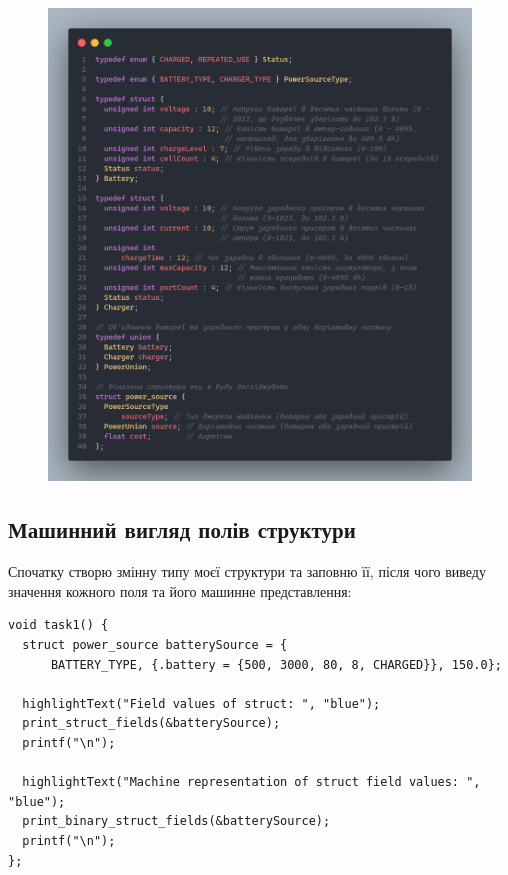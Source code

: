 \begin{figure}[h!]
    \centering
    \includegraphics[width=18cm]{reports/algos/lab4/assets/2.png}
\end{figure}

\clearpage
\subsection{Машинний вигляд полів структури}

Спочатку створю змінну типу моєї структури та заповню її, після чого виведу значення кожного поля та його машинне представлення:

\begin{lstlisting}[style=customc]
void task1() {
  struct power_source batterySource = {
      BATTERY_TYPE, {.battery = {500, 3000, 80, 8, CHARGED}}, 150.0};

  highlightText("Field values of struct: ", "blue");
  print_struct_fields(&batterySource);
  printf("\n");

  highlightText("Machine representation of struct field values: ", "blue");
  print_binary_struct_fields(&batterySource);
  printf("\n");
};
\end{lstlisting}

